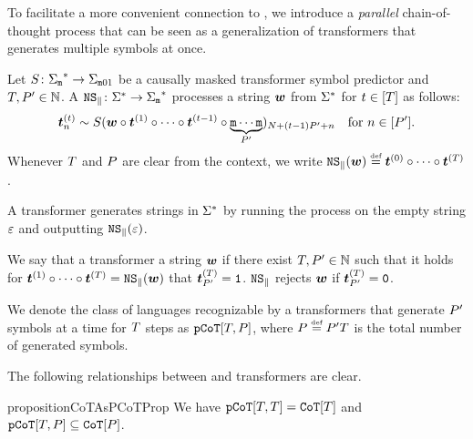 To facilitate a more convenient connection to \MDMsAcr, we introduce a \emph{parallel} chain-of-thought process that can be seen as a generalization of \CoTAcr transformers that generates multiple symbols at once.
\begin{definition}
   Let ${S} \colon {{{{{\Sigma}}_{{\texttt{m}}}}^{*}}} \to {{{\Sigma}}_{{\texttt{m}}01}}$ be a causally masked transformer symbol predictor and ${T}, {P}' \in {{\mathbb{N}}}$.
   A  ${{\texttt{NS}_{\|}}}\colon {{{{{{\Sigma}}^{*}}}}} \to {{{{{\Sigma}}_{{\texttt{m}}}}^{*}}}$ processes a string ${{\boldsymbol{w}}}$ from ${{{{{{\Sigma}}^{*}}}}}$ for $t \in {\left[ {T}\right]}$ as follows:
   \begin{equation}
      {\boldsymbol{t}}^{(t)}_{{n}} \sim {S}({{\boldsymbol{w}}} \circ {\boldsymbol{t}}^{(1)} \circ \cdots \circ {\boldsymbol{t}}^{(t - 1)} \circ \underbrace{{\texttt{m}} \cdots {\texttt{m}}}_{{P}'})_{{{N}} + (t - 1) {P}' + {{n}}}  \text{\quad for } {{n}} \in {\left[ {P}' \right]}.
   \end{equation}
   Whenever ${T}$ and ${P}$ are clear from the context, we write ${{\texttt{NS}_{\|}}}({{\boldsymbol{w}}}) \mathrel{\stackrel{\textnormal{\tiny def}}{=}} {\boldsymbol{t}}^{(0)} \circ \cdots \circ {\boldsymbol{t}}^{({T})}$.
\end{definition}

A \pCoTAcr transformer generates strings in ${{{{{{\Sigma}}^{*}}}}}$ by running the \pCoTAcr process on the empty string ${{\varepsilon}}$ and outputting ${{\texttt{NS}_{\|}}}({{\varepsilon}})$.
\begin{definition}
   We say that a \pCoTAcr transformer  a string ${{\boldsymbol{w}}}$ if there exist ${T}, {P}' \in {{\mathbb{N}}}$ such that it holds for ${\boldsymbol{t}}^{(1)} \circ \cdots \circ {\boldsymbol{t}}^{({T})} = {{\texttt{NS}_{\|}}}({{\boldsymbol{w}}})$ that ${\boldsymbol{t}}^{({T})}_{{P}'} = {\texttt{1}}$. 
   ${{\texttt{NS}_{\|}}}$ rejects ${{\boldsymbol{w}}}$ if ${\boldsymbol{t}}^{({T})}_{{P}'} = {\texttt{0}}$. 
\end{definition}
We denote the class of languages recognizable by a \pCoTAcr transformers that generate ${P}'$ symbols at a time for ${T}$ steps as ${\mathtt{pCoT}}[{T}, {P}]$, where ${P} \mathrel{\stackrel{\textnormal{\tiny def}}{=}} {P}' {T}$ is the total number of generated symbols.

The following relationships between \CoTAcr and \pCoTAcr transformers are clear.
\begin{restatable}{proposition}{CoTAsPCoTProp} \label{prop:cot-as-pcot}
   We have ${\mathtt{pCoT}}[{T}, {T}] = {\mathtt{CoT}}[{T}]$ and ${\mathtt{pCoT}}[{T}, {P}] \subseteq {\mathtt{CoT}}[{P}]$.
\end{restatable}

